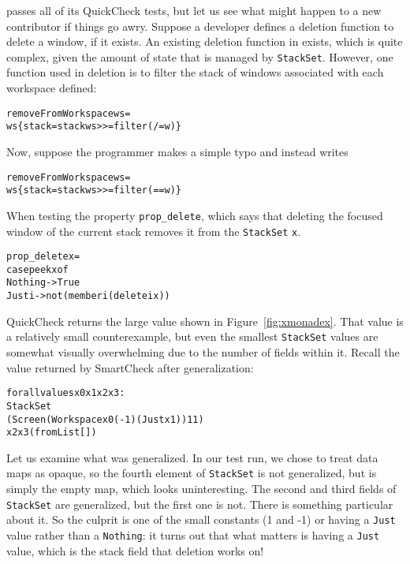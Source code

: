\documentclass{sigplanconf}
\newenvironment{code}{\begin{alltt}\footnotesize}{\end{alltt}}
\newcommand{\ttp}[1]{\texttt{#1}}
\begin{document}
\xmonad passes all of its QuickCheck tests, but let us see what might happen to
a new contributor if things go awry.  Suppose a developer defines a deletion
function to delete a window, if it exists.  An existing deletion function in
\xmonad exists, which is quite complex, given the amount of state that is
managed by \ttp{StackSet}.  However, one function used in deletion is to filter
the stack of windows associated with each workspace defined:
%
\begin{code}
removeFromWorkspace ws =
  ws \{ stack = stack ws >>= filter (/= w) \}
\end{code}
%
\noindent
Now, suppose the programmer makes a simple typo and instead writes
%
\begin{code}
removeFromWorkspace ws =
  ws \{ stack = stack ws >>= filter (== w) \}
\end{code}
%
\noindent
When testing the property \ttp{prop\_delete}, which says that deleting the
focused window of the current stack removes it from the \ttp{StackSet} \ttp{x}.
%
\begin{code}
prop_delete x =
    case peek x of
        Nothing -> True
        Just i  -> not (member i (delete i x))
\end{code}
%
\noindent
QuickCheck returns the large value shown in Figure~\ref{fig:xmonadex}.  That
value is a relatively small counterexample, but even the smallest \ttp{StackSet}
values are somewhat visually overwhelming due to the number of fields within it.
Recall the value returned by SmartCheck after generalization:
%
\begin{code}
forall values x0 x1 x2 x3:
  StackSet
    (Screen (Workspace x0 (-1) (Just x1)) 1 1)
    x2 x3 (fromList [])
\end{code}
%
\noindent
Let us examine what was generalized.  In our test run, we chose to treat data
maps as opaque, so the fourth element of \ttp{StackSet} is not generalized, but
is simply the empty map, which looks uninteresting.  The second and third fields of
\ttp{StackSet} are generalized, but the first one is not.  There is something
particular about it.  So the culprit is one of the small constants (1 and -1) or
having a \ttp{Just} value rather than a \ttp{Nothing}: it turns out that what
matters is having a \ttp{Just} value, which is the stack field that deletion
works on!


\end{document}
